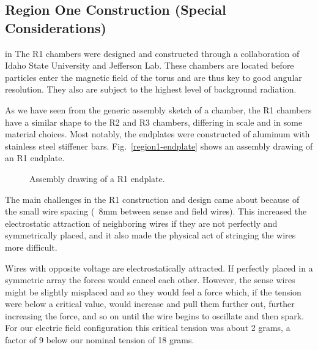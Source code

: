 \subsection{Region One Construction (Special Considerations)}

 in 
The R1 chambers were designed and constructed through a collaboration 
of Idaho State University and Jefferson Lab.  These 
chambers are located before particles enter the magnetic field of the torus
and are thus key to good angular resolution.  They also are subject to the
highest level of background radiation. 

As we have seen from the generic assembly sketch of a chamber, the R1
chambers have a similar shape to the R2 and R3 chambers, differing in
scale and in some material choices.
Most notably, the endplates were constructed of aluminum with stainless
steel stiffener bars.
Fig.~\ref{region1-endplate} shows an assembly drawing of an R1 endplate.


\begin{figure}[htpb]   
\vspace{7.0cm}

\caption{\small{Assembly drawing of a R1 endplate.}}
\label{region1}
\end{figure}   

The main challenges in the R1 construction and design came about because
of the small wire spacing (~8mm between sense and field wires).  This
increased the electrostatic attraction of neighboring wires if they are
not perfectly and symmetrically placed, and it also made the physical act
of stringing the wires more difficult.

Wires with opposite voltage are electrostatically attracted.  If perfectly
placed in a symmetric array the forces would cancel each other. 
However, the sense wires might be slightly misplaced and so they would feel
a force which, if the tension were below a critical value, would increase
and pull them further out, further increasing the force, and so on until 
the wire begins to oscillate and then spark.  For our electric field configuration
this critical tension was about 2 grams, a factor of 9 below our nominal
tension of 18 grams.


